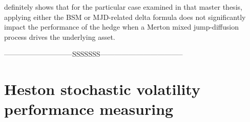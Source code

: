 \documentclass[12pt]{report}
\begin{document}
 definitely shows that for the particular case examined in that master thesis, applying either the BSM or MJD-related delta formula does not significantly impact the performance of the hedge when a Merton mixed jump-diffusion process drives the underlying asset.





-----------------------------SSSSSSS-----------------------------------













































\section{Heston stochastic volatility performance measuring}
\label{sec:section name}
\end{document}
